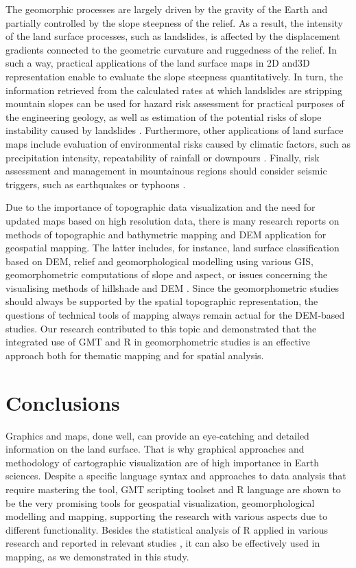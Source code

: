 \documentclass[land,article,submit,pdftex,moreauthors]{Definitions/mdpi}
\begin{document}
The geomorphic processes are largely driven by the gravity of the Earth and partially controlled by the slope steepness of the relief. As a result, the intensity of the land surface processes, such as landslides, is affected by the displacement gradients connected to the geometric curvature and ruggedness of the relief. In such a way, practical applications of the land surface maps in 2D and3D representation enable to evaluate the slope steepness quantitatively. In turn, the information retrieved from the calculated rates at which landslides are stripping mountain slopes can be used for hazard risk assessment for practical purposes of the engineering geology, as well as estimation of the potential risks of slope instability caused by landslides \cite{FUJISAWA2010150,Chung}. Furthermore, other applications of land surface maps include evaluation of environmental risks caused by climatic factors, such as precipitation intensity, repeatability of rainfall or downpours \cite{Tsunetaka,Oku,HUANG2022108236}. Finally, risk assessment and management in mountainous regions should consider seismic triggers, such as earthquakes or typhoons \cite{Yamada,Wangetal2010,HIRATA2019105217}. 

Due to the importance of topographic data visualization and the need for updated maps based on high resolution data, there is many research reports on methods of topographic and bathymetric mapping and DEM application for geospatial mapping. The latter includes, for instance, land surface classification based on DEM, relief and geomorphological modelling using various GIS, geomorphometric computations of slope and aspect, or issues concerning the visualising methods of hillshade and DEM \cite{PRIMA2006373,LIN2004159,FisherTate,HAYAKAWA200690}. Since the geomorphometric studies should always be supported by the spatial topographic representation, the questions of technical tools of mapping always remain actual for the DEM-based studies. Our research contributed to this topic and demonstrated that the integrated use of GMT and R in geomorphometric studies is an effective approach both for thematic mapping and for spatial analysis. 

\section{Conclusions}

Graphics and maps, done well, can provide an eye-catching and detailed information on the land surface. That is why  graphical approaches and methodology of cartographic visualization are of high importance in Earth sciences. Despite a specific language syntax and approaches to data analysis that require mastering the tool, GMT scripting toolset and R language are shown to be the very promising tools for geospatial visualization, geomorphological modelling and mapping, supporting the research with various aspects due to different functionality. Besides the statistical analysis of R applied in various research and reported in relevant studies \cite{GRUNSKY20021219,Lemenkova201991,BIVAND20001043}, it can also be effectively used in mapping, as we demonstrated in this study. 
\end{document}
